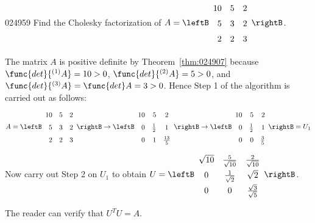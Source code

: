 \begin{example}{}{024959}
Find the Cholesky factorization of $A = \leftB \begin{array}{rrr}
10 & 5 & 2 \\
5 & 3 & 2 \\
2 & 2 & 3
\end{array}\rightB$.


\begin{solution}
  The matrix $A$ is positive definite by Theorem~\ref{thm:024907} because $\func{det}{^{(1)}A} = 10 > 0$, $\func{det}{^{(2)}A} = 5 > 0$, and $\func{det}{^{(3)}A} = \func{det} A = 3 > 0$. Hence Step 1 of the algorithm is carried out as follows:
\begin{equation*}
A = \leftB \begin{array}{rrr}
10 & 5 & 2 \\
5 & 3 & 2 \\
2 & 2 & 3
\end{array}\rightB \rightarrow \leftB \begin{array}{rrc}
10 & 5 & 2 \\
0 & \frac{1}{2} & 1 \\
0 & 1 & \frac{13}{5}
\end{array}\rightB \rightarrow \leftB \begin{array}{rrr}
10 & 5 & 2 \\
0 & \frac{1}{2} & 1 \\
0 & 0 & \frac{3}{5}
\end{array}\rightB = U_{1}
\end{equation*}
Now carry out Step 2 on $U_{1}$ to obtain $U = \leftB \def\arraystretch{1.5}\begin{array}{ccc}
\sqrt{10} & \frac{5}{\sqrt{10}} & \frac{2}{\sqrt{10}} \\
0 & \frac{1}{\sqrt{2}} & \sqrt{2} \\
0 & 0 & \frac{\sqrt{3}}{\sqrt{5}}
\end{array}\rightB$.

The reader can verify that $U^{T}U = A$.
\end{solution}
\end{example}

